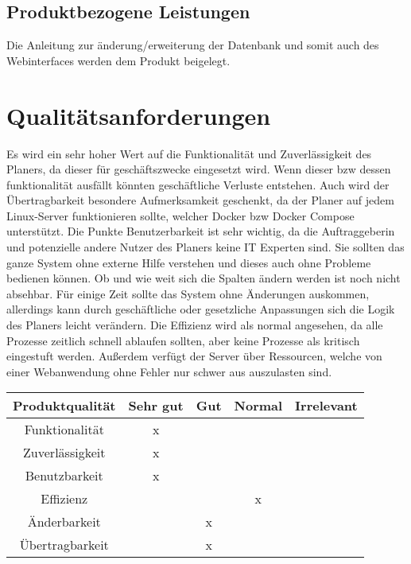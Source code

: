     \subsection{Produktbezogene Leistungen}
    Die Anleitung zur änderung/erweiterung der Datenbank und somit auch des Webinterfaces werden dem Produkt beigelegt.


\section{Qualitätsanforderungen}
    Es wird ein sehr hoher Wert auf die Funktionalität und Zuverlässigkeit des Planers, da dieser für geschäftszwecke eingesetzt wird. Wenn dieser bzw dessen funktionalität ausfällt könnten geschäftliche Verluste entstehen.  Auch wird der Übertragbarkeit besondere Aufmerksamkeit geschenkt, da der Planer auf jedem Linux-Server funktionieren sollte, welcher Docker bzw Docker Compose unterstützt. Die Punkte Benutzerbarkeit ist sehr wichtig, da die Auftraggeberin und potenzielle andere Nutzer des Planers keine IT Experten sind. Sie sollten das ganze System ohne externe Hilfe verstehen und dieses auch ohne Probleme bedienen können. Ob und wie weit sich die Spalten ändern werden ist noch nicht absehbar. Für einige Zeit sollte das System ohne Änderungen auskommen, allerdings kann durch geschäftliche oder gesetzliche Anpassungen sich die Logik des Planers leicht verändern. Die Effizienz wird als normal angesehen, da alle Prozesse zeitlich schnell ablaufen sollten, aber keine Prozesse als kritisch eingestuft werden. Außerdem verfügt der Server über Ressourcen, welche von einer Webanwendung ohne Fehler nur schwer aus auszulasten sind.
    
    \begin{center}
    
    \begin{tabular}{|c|c|c|c|c|}
    
    \hline
        \rowcolor{gray} \textbf{\color{white}Produktqualität}&\textbf{\color{white}Sehr gut}&\textbf{\color{white}Gut}&\textbf{\color{white}Normal}&\textbf{\color{white}Irrelevant} \\
         \hline 
         Funktionalität&x&&&\\
         \hline
         Zuverlässigkeit&x&&&\\
         \hline
         Benutzbarkeit&x&&&\\
         \hline
         Effizienz&&&x&\\
         \hline
         Änderbarkeit&&x&&\\
         \hline
         Übertragbarkeit&&x&&\\
    \hline
    \end{tabular}
    \end{center}